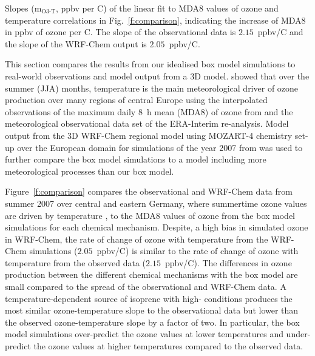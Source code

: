 \begin{table}[t]%
    \centering%
    \caption{Slopes (m$_{\text{O3-T}}$, ppbv per \degree C) of the linear fit to MDA8 values of ozone and temperature correlations in Fig.~\ref{f:comparison}, indicating the increase of MDA8 in ppbv of ozone per \degree C. The slope of the observational data is $2.15$~ppbv/\degree C and the slope of the WRF-Chem output is $2.05$~ppbv/\degree C.}%
    \label{t:mo3-t}%
    \vspace{2mm}
    \vspace{-4mm}
\end{table} 

This section compares the results from our idealised box model simulations to real-world observations and model output from a 3D model.
\citet{Otero:2016} showed that over the summer (JJA) months, temperature is the main meteorological driver of ozone production over many regions of central Europe using the interpolated observations of the maximum daily 8~h mean (MDA8) of ozone from \citet{Schnell:2015} and the meteorological observational data set of the ERA-Interim re-analysis.
Model output from the 3D WRF-Chem regional model using MOZART-4 chemistry set-up over the European domain for simulations of the year 2007 from \citet{Mar:2016} was used to further compare the box model simulations to a model including more meteorological processes than our box model.

Figure~\ref{f:comparison} compares the observational and WRF-Chem data from summer 2007 over central and eastern Germany, where summertime ozone values are driven by temperature \citep{Otero:2016}, to the MDA8 values of ozone from the box model simulations for each chemical mechanism.
Despite, a high bias in simulated ozone in WRF-Chem, the rate of change of ozone with temperature from the WRF-Chem simulations ($2.05$~ppbv/\degree C) is similar to the rate of change of ozone with temperature from the observed data ($2.15$~ppbv/\degree C).
The differences in ozone production between the different chemical mechanisms with the box model are small compared to the spread of the observational and WRF-Chem data.
A temperature-dependent source of isoprene with high- conditions produces the most similar ozone-temperature slope to the observational data but lower than the observed ozone-temperature slope by a factor of two.
In particular, the box model simulations over-predict the ozone values at lower temperatures and under-predict the ozone values at higher temperatures compared to the observed data.

